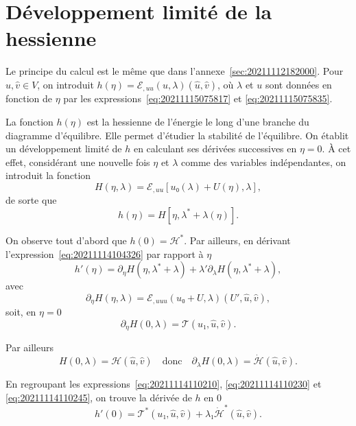 \documentclass[12pt, final]{amsart}
\begin{document}
\section{Développement limité de la hessienne}
\label{sec:20211115081016}

Le principe du calcul est le même que dans
l'annexe~\ref{sec:20211112182000}. Pour \(\hat{u}, \hat{v}∈V\), on introduit
\(h(η)=ℰ_{,uu}(u, λ)(\hat{u}, \hat{v})\), où \(λ\) et \(u\) sont données en
fonction de \(η\) par les expressions~\eqref{eq:20211115075817} et
\eqref{eq:20211115075835}.

La fonction \(h(η)\) est la hessienne de l'énergie le long d'une branche du
diagramme d'équilibre. Elle permet d'étudier la stabilité de l'équilibre. On
établit un développement limité de \(h\) en calculant ses dérivées successives
en \(η=0\). \`A cet effet, considérant une nouvelle fois \(η\) et \(λ\) comme
des variables indépendantes, on introduit la fonction
\begin{equation}
  H(η, λ)=ℰ_{,uu}[u₀(λ)+U(η), λ],
\end{equation}
de sorte que
\begin{equation}
  \label{eq:20211114104326}
  h(η)=H[η, λ^*+λ(η)].
\end{equation}

On observe tout d'abord que \(h(0)=ℋ^*\). Par ailleurs, en dérivant
l'expression~\eqref{eq:20211114104326} par rapport à \(η\)
\begin{equation}
  \label{eq:20211114110210}
  h'(η)=∂_η H(η, λ^*+λ)+λ'∂_λ H(η, λ^*+λ),
\end{equation}
avec
\begin{equation}
  \label{eq:20211114110852}
  ∂_η H(η, λ)=ℰ_{,uuu}(u₀+U, λ)(U', \hat{u}, \hat{v}),
\end{equation}
soit, en \(η=0\)
\begin{equation}
  \label{eq:20211114110230}
  ∂_η H(0, λ)=𝒯(u₁, \hat{u}, \hat{v}).
\end{equation}

Par ailleurs
\begin{equation}
  \label{eq:20211114110245}
  H(0, λ)=ℋ(\hat{u}, \hat{v})\quad\text{donc}\quad∂_λ H(0, λ)=\dot{ℋ}(\hat{u}, \hat{v}).
\end{equation}

En regroupant les expressions~\eqref{eq:20211114110210},
\eqref{eq:20211114110230} et \eqref{eq:20211114110245}, on trouve la dérivée de
\(h\) en 0
\begin{equation}
  h'(0)=𝒯^*(u₁, \hat{u}, \hat{v})+λ₁\dot{ℋ}^*(\hat{u}, \hat{v}).
\end{equation}
\end{document}
